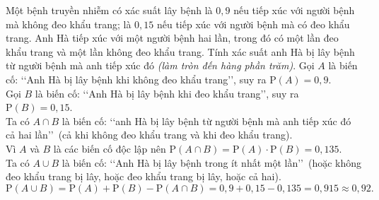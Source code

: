 \begin{ex}%
	Một bệnh truyền nhiễm có xác suất lây bệnh là $0{,}9$ nếu tiếp xúc với người bệnh mà không đeo khẩu trang; là $0{,}15$ nếu tiếp xúc với người bệnh mà có đeo khẩu trang. Anh Hà tiếp xúc với một người bệnh hai lần, trong đó có một lần đeo khẩu trang và một lần không đeo khẩu trang. Tính xác suất anh Hà bị lây bệnh từ người bệnh mà anh tiếp xúc đó \textit{(làm tròn đến hàng phần trăm)}.
	\loigiai
	{
		Gọi $A$ là biến cố: \lq\lq Anh Hà bị lây bệnh khi không đeo khẩu trang\rq\rq, suy ra $\mathrm{P}(A)=0{,}9$.\\
		Gọi $B$ là biến cố: \lq\lq Anh Hà bị lây bệnh khi đeo khẩu trang\rq\rq, suy ra $\mathrm{P}(B)=0{,}15$.\\
		Ta có $A\cap B$ là biến cố: \lq\lq anh Hà bị lây bệnh từ người bệnh mà anh tiếp xúc đó cả hai lần\rq\rq\,  (cả khi không đeo khẩu trang và khi đeo khẩu trang). \\
		Vì $A$ và $B$ là các biến cố độc lập nên $\mathrm{P}(A\cap B)=\mathrm{P}(A)\cdot\mathrm{P}(B)=0{,}135$.\\
		Ta có  $A\cup B$ là biến cố: \lq\lq Anh Hà bị lây bệnh trong ít nhất một lần\rq\rq\, (hoặc không đeo khẩu trang bị lây, hoặc đeo khẩu trang bị lây, hoặc cả hai).
		$$\mathrm{P}(A\cup B)=\mathrm{P}(A)+\mathrm{P}(B) - \mathrm{P}(A\cap B) =0{,}9+0{,}15-0{,}135=0{,}915\approx 0{,}92.$$
	}
\end{ex}

